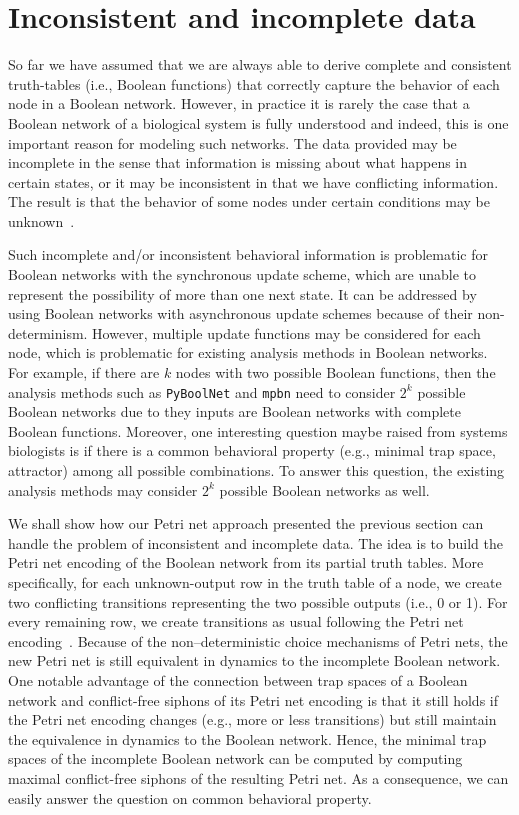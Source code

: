\documentclass[preprint,12pt]{elsarticle}
\begin{document}
\section{Inconsistent and incomplete data}
\label{sec:incomplete-data}

So far we have assumed that we are always able to derive complete
and consistent truth-tables (i.e., Boolean functions) that correctly capture the behavior of each node in a Boolean network. 
However, in practice it is rarely the
case that a Boolean network of a biological system is fully understood and indeed, this is one important reason for modeling such networks. 
The data provided may be incomplete in the sense that information is missing about what happens in certain states, or it may be inconsistent in that we have conflicting information.
The result is that the behavior of some nodes under certain conditions may be unknown~\cite{Steggles2006}.

Such incomplete and/or inconsistent behavioral information is
problematic for Boolean networks with the synchronous update scheme, which are unable to represent the possibility of more than one next state.
It can be addressed by using Boolean networks with asynchronous update schemes because of their non-determinism.
However, multiple update functions may be considered for each node, which is problematic for existing analysis methods in Boolean networks.
For example, if there are \(k\) nodes with two possible Boolean functions, then the analysis methods such as \texttt{PyBoolNet} and \texttt{mpbn} need to consider \(2^k\) possible Boolean networks due to they inputs are Boolean networks with complete Boolean functions.
Moreover, one interesting question maybe raised from systems biologists is if there is a common behavioral property (e.g., minimal trap space, attractor) among all possible combinations.
To answer this question, the existing analysis methods may consider \(2^k\) possible Boolean networks as well.

We shall show how our Petri net approach presented the previous section can handle the problem of inconsistent and incomplete data.
The idea is to build the Petri net encoding of the Boolean network from its partial truth tables.
More specifically, for each unknown-output row in the truth table of a node, we create two conflicting transitions representing the two possible outputs (i.e., 0 or 1).
For every remaining row, we create transitions as usual following the Petri net encoding~\cite{chatain2014characterization}.
Because of the non–deterministic choice mechanisms of Petri nets, the new Petri net is still equivalent in dynamics to the incomplete Boolean network.
One notable advantage of the connection between trap spaces of a Boolean network and conflict-free siphons of its Petri net encoding is that it still holds if the Petri net encoding changes (e.g., more or less transitions) but still maintain the equivalence in dynamics to the Boolean network.
Hence, the minimal trap spaces of the incomplete Boolean network can be computed by computing maximal conflict-free siphons of the resulting Petri net.
As a consequence, we can easily answer the question on common behavioral property.
\end{document}
